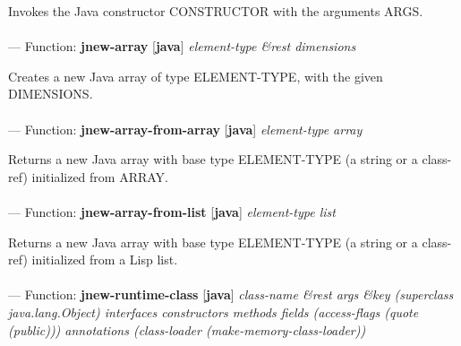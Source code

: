 \begin{adjustwidth}{5em}{5em}
Invokes the Java constructor CONSTRUCTOR with the arguments ARGS.
\end{adjustwidth}

\paragraph{}
\label{JAVA:JNEW-ARRAY}
--- Function: \textbf{jnew-array} [\textbf{java}] \textit{element-type \&rest dimensions}

\begin{adjustwidth}{5em}{5em}
Creates a new Java array of type ELEMENT-TYPE, with the given DIMENSIONS.
\end{adjustwidth}

\paragraph{}
\label{JAVA:JNEW-ARRAY-FROM-ARRAY}
--- Function: \textbf{jnew-array-from-array} [\textbf{java}] \textit{element-type array}

\begin{adjustwidth}{5em}{5em}
Returns a new Java array with base type ELEMENT-TYPE (a string or a class-ref)
   initialized from ARRAY.
\end{adjustwidth}

\paragraph{}
\label{JAVA:JNEW-ARRAY-FROM-LIST}
--- Function: \textbf{jnew-array-from-list} [\textbf{java}] \textit{element-type list}

\begin{adjustwidth}{5em}{5em}
Returns a new Java array with base type ELEMENT-TYPE (a string or a class-ref)
   initialized from a Lisp list.
\end{adjustwidth}

\paragraph{}
\label{JAVA:JNEW-RUNTIME-CLASS}
--- Function: \textbf{jnew-runtime-class} [\textbf{java}] \textit{class-name \&rest args \&key (superclass java.lang.Object) interfaces constructors methods fields (access-flags (quote (public))) annotations (class-loader (make-memory-class-loader))}

